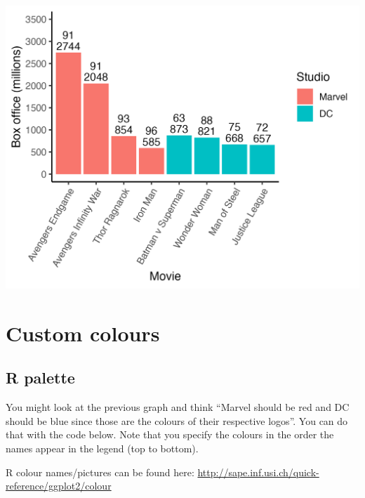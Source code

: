 \documentclass[
]{krantz}
\begin{document}
\includegraphics[width=0.65\linewidth]{ch_graphing/images/custom_order2}

\hypertarget{custom-colours}{%
\section{Custom colours}\label{custom-colours}}

\hypertarget{r-palette}{%
\subsection{R palette}\label{r-palette}}

You might look at the previous graph and think ``Marvel should be red and DC should be blue since those are the colours of their respective logos''. You can do that with the code below. Note that you specify the colours in the order the names appear in the legend (top to bottom).

R colour names/pictures can be found here: \url{http://sape.inf.usi.ch/quick-reference/ggplot2/colour}
\end{document}
